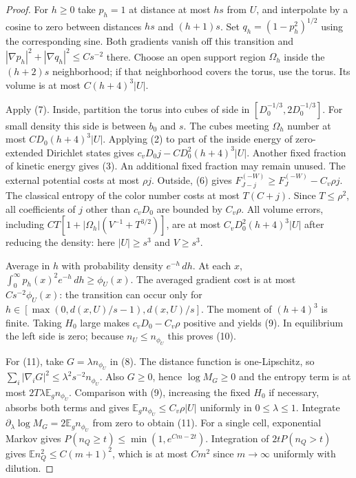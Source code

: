 \begin{proof}
For $h\geq0$ take $p_h=1$ at distance at most $hs$ from $U$,
and interpolate by a cosine to zero between distances $hs$ and
$(h+1)s$. Set $q_h=(1-p_h^2)^{1/2}$ using the corresponding sine.
Both gradients vanish off this transition and
$|\nabla p_h|^2+|\nabla q_h|^2\leq Cs^{-2}$ there. Choose
an open support region $\Omega_h$ inside the $(h+2)s$
neighborhood; if that neighborhood covers the torus, use the torus.
Its volume is at most $C(h+4)^3|U|$.

Apply (7). Inside, partition the torus into cubes of side in
$[D_0^{-1/3},2D_0^{-1/3}]$. For small density this side is between
$b_0$ and $s$. The cubes meeting $\Omega_h$ number at most
$CD_0(h+4)^3|U|$. Applying (2) to part of the inside energy of
zero-extended Dirichlet states gives
$c_vD_0j-CD_0^2(h+4)^3|U|$.
Another fixed fraction of kinetic energy gives (3). An additional
fixed fraction may remain unused. The external potential costs at
most $\rho j$. Outside, (6) gives
$F_{J-j}^{(-W)}\geq F_J^{(-W)}-C_v\rho j$.
The classical entropy of the color number costs at most $T(C+j)$.
Since $T\leq\rho^2$, all coefficients of $j$ other than
$c_vD_0$ are bounded by $C_v\rho$. All volume errors, including
$CT[1+|\Omega_h|(V^{-1}+T^{3/2})]$, are at most
$C_vD_0^2(h+4)^3|U|$ after reducing the density: here
$|U|\geq s^3$ and $V\geq s^3$.

Average in $h$ with probability density $e^{-h}\,dh$. At each $x$,
$\int_0^\infty p_h(x)^2e^{-h}\,dh\geq\phi_U(x)$.
The averaged gradient cost is at most $Cs^{-2}\phi_U(x)$:
the transition can occur only for
$h\in[\max(0,d(x,U)/s-1),d(x,U)/s]$.
The moment of $(h+4)^3$ is finite. Taking $H_0$ large makes
$c_vD_0-C_v\rho$ positive and yields (9).
In equilibrium the left side is zero; because
$n_U\leq n_{\phi_U}$ this proves (10).

For (11), take $G=\lambda n_{\phi_U}$ in (8).
The distance function is one-Lipschitz, so
$\sum_i|\nabla_iG|^2\leq\lambda^2s^{-2}n_{\phi_U}$.
Also $G\geq0$, hence $\log M_G\geq0$ and the entropy term is
at most $2T\lambda\mathbb E_g n_{\phi_U}$.
Comparison with (9), increasing the fixed $H_0$ if necessary,
absorbs both terms and gives
$\mathbb E_g n_{\phi_U}\leq C_v\rho|U|$ uniformly in
$0\leq\lambda\leq1$. Integrate
$\partial_\lambda\log M_G=2\mathbb E_g n_{\phi_U}$
from zero to obtain (11).
For a single cell, exponential Markov gives
$P(n_Q\geq t)\leq\min(1,e^{Cm-2t})$.
Integration of $2tP(n_Q>t)$ gives $\mathbb E n_Q^2\leq C(m+1)^2$,
which is at most $Cm^2$ since $m\to\infty$ uniformly with dilution.
\end{proof}

